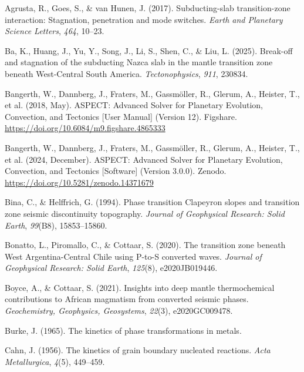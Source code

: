 \documentclass[draft,linenumbers]{agujournal2019}
\newlength{\cslhangindent}
\newenvironment{CSLReferences}[2]
 {\begin{list}{}{
  \setlength{\itemindent}{0pt}
  \setlength{\leftmargin}{0pt}
  \setlength{\parsep}{0pt}
  \ifodd #1
   \setlength{\leftmargin}{\cslhangindent}
   \setlength{\itemindent}{-\cslhangindent}
  \fi
  \setlength{\itemsep}{#2\baselineskip}
  }
  \item\relax}
 {\end{list}}
\begin{document}
\protect{}\label{refs}
\begin{CSLReferences}{1}{0}
{Agrusta, R., Goes, S., \& van Hunen, J.} (2017). Subducting-slab
transition-zone interaction: Stagnation, penetration and mode switches.
\emph{Earth and Planetary Science Letters}, \emph{464}, 10--23.

Ba, K., Huang, J., Yu, Y., Song, J., Li, S., Shen, C., \& Liu, L.
(2025). Break-off and stagnation of the subducting {Nazca} slab in the
mantle transition zone beneath {West-Central South America}.
\emph{Tectonophysics}, \emph{911}, 230834.

Bangerth, W., Dannberg, J., Fraters, M., Gassmöller, R., Glerum, A.,
Heister, T., et al. (2018, May). {ASPECT: Advanced Solver for Planetary
Evolution, Convection, and Tectonics {[}User Manual{]}} (Version 12).
Figshare. \url{https://doi.org/10.6084/m9.figshare.4865333}

Bangerth, W., Dannberg, J., Fraters, M., Gassmöller, R., Glerum, A.,
Heister, T., et al. (2024, December). {ASPECT: Advanced Solver for
Planetary Evolution, Convection, and Tectonics {[}Software{]}} (Version
3.0.0). Zenodo. \url{https://doi.org/10.5281/zenodo.14371679}

Bina, C., \& Helffrich, G. (1994). Phase transition {Clapeyron} slopes
and transition zone seismic discontinuity topography. \emph{Journal of
Geophysical Research: Solid Earth}, \emph{99}(B8), 15853--15860.

Bonatto, L., Piromallo, C., \& Cottaar, S. (2020). The transition zone
beneath {West Argentina}-{Central Chile} using {P-to-S} converted waves.
\emph{Journal of Geophysical Research: Solid Earth}, \emph{125}(8),
e2020JB019446.

Boyce, A., \& Cottaar, S. (2021). Insights into deep mantle
thermochemical contributions to {African} magmatism from converted
seismic phases. \emph{Geochemistry, Geophysics, Geosystems},
\emph{22}(3), e2020GC009478.

Burke, J. (1965). The kinetics of phase transformations in metals.

Cahn, J. (1956). The kinetics of grain boundary nucleated reactions.
\emph{Acta Metallurgica}, \emph{4}(5), 449--459.


\end{CSLReferences}
\end{document}
